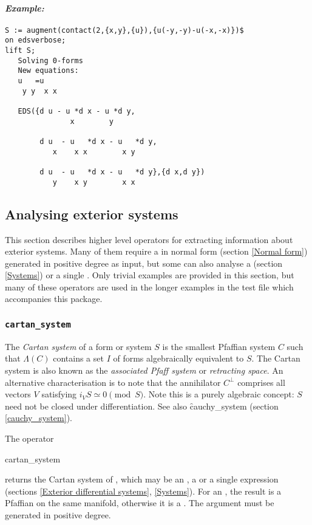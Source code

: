 \paragraph{\it Example:}
\begin{verbatim}
S := augment(contact(2,{x,y},{u}),{u(-y,-y)-u(-x,-x)})$
on edsverbose;
lift S;
   Solving 0-forms 
   New equations:  
   u   =u
    y y  x x  

   EDS({d u - u *d x - u *d y,
               x        y 

        d u  - u   *d x - u   *d y,
           x    x x        x y 

        d u  - u   *d x - u   *d y},{d x,d y})
           y    x y        x x 
\end{verbatim}



\subsection{Analysing exterior systems}
\label{Analysing exterior systems}

This section describes higher level operators for extracting information
about exterior systems. Many of them require a  in normal form
(section \ref{Normal form}) generated in positive degree as input, but some
can also analyse a  (section \ref{Systems}) or a single
. Only trivial examples are provided in this section, but many
of these operators are used in the longer examples in the test file which
accompanies this package.


\subsubsection{\tt cartan\_system}
\label{cartan_system}

The {\em Cartan system} of a form or system $S$ is the smallest Pfaffian
system $C$ such that $\Lambda(C)$ contains a set $I$ of forms algebraically
equivalent to $S$. The Cartan system is also known as the {\em associated
Pfaff system} or {\em retracting space}. An alternative characterisation is
to note that the annihilator $C^\perp$ comprises all vectors $V$ satisfying
$i_V S \simeq 0 \pmod{S}$.  Note this is a purely algebraic concept: $S$
need not be closed under differentiation. See also \f{cauchy\_system}
(section \ref{cauchy_system}).

The operator
\begin{edssyntax}
	cartan\_system 
\end{edssyntax}
returns the Cartan system of , which may be an , a
 or a single  expression (sections \ref{Exterior
differential systems}, \ref{Systems}). For an , the result is a
Pfaffian  on the same manifold, otherwise it is a
. The argument must be generated in positive degree.

